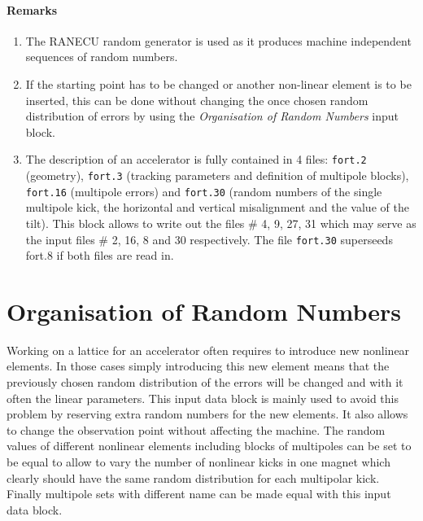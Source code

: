 \paragraph{Remarks}

\begin{enumerate}
    \item The RANECU random generator \cite{RANECU} is used as it produces machine independent sequences of random numbers.
    \item If the starting point has to be changed or another non-linear element is to be inserted, this can be done without changing the once chosen random distribution of errors by using the \textit{Organisation of Random Numbers} input block.
    \item The description of an accelerator is fully contained in 4 files: \texttt{fort.2} (geometry), \texttt{fort.3} (tracking parameters and definition of multipole blocks), \texttt{fort.16} (multipole errors) and \texttt{fort.30} (random numbers of the single multipole kick, the horizontal and vertical misalignment and the value of the tilt). This block allows to write  out the files \# 4, 9, 27, 31 which may serve as the input files \# 2, 16, 8 and 30 respectively. The file \texttt{fort.30} superseeds fort.8 if both files are read in.
\end{enumerate}

\section{Organisation of Random Numbers} \label{OrgRan}

Working on a lattice for an accelerator often requires to introduce new nonlinear elements.
In those cases simply introducing this new element means that the previously chosen random distribution of the errors will be changed and with it often the linear parameters.
This input data block is mainly used to avoid this problem by reserving extra random numbers for the new elements.
It also allows to change the observation point without affecting the machine.
The random values of different nonlinear elements including blocks of multipoles can be set to be equal to allow to vary the number of nonlinear kicks in one magnet which clearly should have the same random distribution for each multipolar kick.
Finally multipole sets with different name can be made equal with this input data block.

